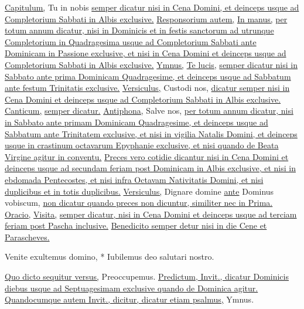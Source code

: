 \begin{multicols*}{2}
\newline \ul{Capitulum,} Tu in nobis \ul{semper dicatur nisi in Cena Domini, et deinceps usque ad Completorium Sabbati in Albis exclusive.}
\newline \ul{Responsorium autem,} \hyperlink{in-manus-tuas-breve}{In manus,} \ul{per totum annum dicatur, nisi in Dominicis et in festis sanctorum ad utrunque Completorium in Quadragesima usque ad Completorium Sabbati ante Dominicam in Passione exclusive, et nisi in Cena Domini et deinceps usque ad Completorium Sabbati in Albis exclusive.}
\newline \ul{Ymnus,} \hyperlink{te-lucis}{Te lucis,} \ul{semper dicatur nisi in Sabbato ante prima Dominicam Quadragesime, et deinceps usque ad Sabbatum ante festum Trinitatis exclusive.}
\newline \ul{Versiculus,} Custodi nos, \ul{dicatur semper nisi in Cena Domini et deinceps usque ad Completorium Sabbati in Albis exclusive.}
\newline \ul{Canticum,}  \ul{semper dicatur.}
\newline \ul{Antiphona,} Salve nos, \ul{per totum annum dicatur, nisi in Sabbato ante primam Dominicam Quadragesime, et deinceps usque ad Sabbatum ante Trinitatem exclusive, et nisi in vigilia Natalis Domini, et deinceps usque in crastinum octavarum Epyphanie exclusive, et nisi quando de Beata Virgine agitur in conventu.}
\newline \ul{Preces vero cotidie dicantur nisi in Cena Domini et deinceps usque ad secundam feriam post Dominicam in Albis exclusive, et nisi in ebdomada Pentecostes, et nisi infra Octavam Nativitatis Domini, et nisi duplicibus et in totis duplicibus.}
\newline \ul{Versiculus,} Dignare domine \ul{ante} Dominus vobiscum, \ul{non dicatur quando preces non dicuntur, similiter nec in Prima.}
\newline \ul{Oracio,} \hyperlink{visita-quesumus}{Visita,} \ul{semper dicatur, nisi in Cena Domini et deinceps usque ad terciam feriam post Pascha inclusive.}
\newline \ul{Benedicito semper detur nisi in die Cene et Parascheves.}
\begin{invitatory}
{Venite exultemus domino, * Iubilemus deo salutari nostro.}
\end{invitatory}
\ul{Quo dicto sequitur versus,} Preoccupemus. \ul{Predictum, Invit., dicatur Dominicis diebus usque ad Septuagesimam exclusive quando de Dominica agitur. Quandocumque autem Invit., dicitur, dicatur etiam psalmus,}  {\color{Red} Ymnus.}

\end{multicols*}
